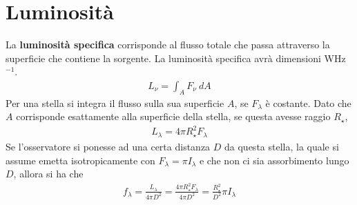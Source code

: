 \documentclass[a4paper, oneside]{book}
\begin{document}
\section{Luminosità}
\begin{figure}
    \centering
\end{figure}
La \textbf{luminosità specifica} corrisponde al flusso totale che passa attraverso 
la superficie che contiene la sorgente. La luminosità specifica avrà dimensioni WHz$^{-1}$.
\begin{align}
    L_\nu = \int_{A} F_\nu \ dA
\end{align}
Per una stella si integra il flusso sulla sua superficie $A$, se $F_\lambda$ è costante.
Dato che $A$ corrisponde esattamente alla superficie della stella, 
se questa avesse raggio $R_\star$,
\begin{align}
    L_\lambda = 4\pi R^{2}_\star F_\lambda 
\end{align}
Se l'osservatore si ponesse ad una 
certa distanza $D$ da questa stella, la quale si assume emetta isotropicamente con $F_\lambda = \pi I_\lambda$ e che
non ci sia assorbimento lungo $D$, allora si ha che
\begin{gather*}
    f_\lambda = \frac{L_\lambda}{4\pi D^{2}} = \frac{4\pi R_\star^{2}F_\lambda}{4\pi D^{2}} = \frac{R_\star^{2}}{D^{2}}\pi I_\lambda
\end{gather*} 
\end{document}
